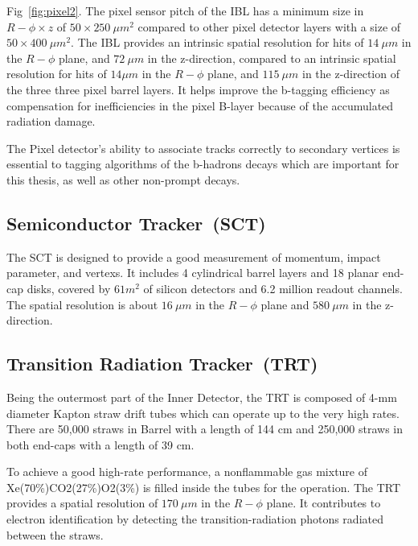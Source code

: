 Fig~\ref{fig:pixel2}. The pixel sensor pitch of the IBL has a minimum size in $R-\phi \times z$ of $50 \times 250~\mu m^2$ compared to other pixel detector layers with a size of $50 \times 400~\mu m^2$. 	 The IBL provides an intrinsic spatial resolution for hits of $14~\mu m$ in the $R-\phi$ plane, and
$72~\mu m$ in the z-direction, compared to an intrinsic spatial resolution for hits of $14\mu m$ in the $R-\phi$ plane, and $115~\mu m$ in the z-direction of the three three pixel barrel layers.
It helps improve the b-tagging efficiency as compensation for inefficiencies in the pixel B-layer because of the accumulated radiation damage.
\par The Pixel detector's ability to associate tracks correctly to secondary vertices is essential to tagging algorithms of the b-hadrons decays which are important for this thesis, as well as other non-prompt decays.
\subsection{Semiconductor Tracker~(SCT)}
The SCT \cite{AHMAD200798} is designed to provide a good measurement of momentum, impact parameter, and vertexs. It includes 4 cylindrical barrel layers and 18 planar end-cap disks, covered by $61 m^2$ of silicon detectors and 6.2 million readout channels. The spatial resolution is about $16~\mu m$ in the $R-\phi$ plane and $580~\mu m$ in the z-direction.

\subsection{Transition Radiation Tracker~(TRT)}


Being the outermost part of the Inner Detector, the TRT \cite{Abat:2008zza} is composed of 4-mm diameter Kapton straw drift tubes which can operate up to the very high rates. There are 50,000 straws in Barrel with a length of 144 cm and 250,000 straws in both end-caps with a length of 39 cm.

To achieve a good high-rate performance, a nonflammable gas mixture of Xe(70\%)CO2(27\%)O2(3\%) is filled inside the tubes for the operation. The TRT provides a spatial resolution of $170~\mu m$ in the $R-\phi$ plane. It contributes to electron identification by detecting the transition-radiation photons radiated between the straws. 


